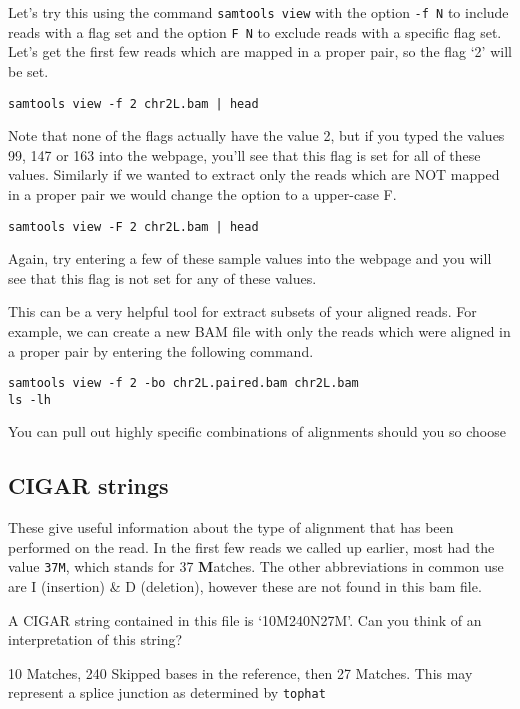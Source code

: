 \begin{steps}
Let's try this using the command \texttt{samtools view} with the option \texttt{-f N} to include reads with a flag set and the option \texttt{F N} to exclude reads with a specific flag set.
Let's get the first few reads which are mapped in a proper pair, so the flag `2' will be set.\\
\begin{lstlisting}
samtools view -f 2 chr2L.bam | head
\end{lstlisting}
Note that none of the flags actually have the value 2, but if you typed the values 99, 147 or 163 into the webpage, you'll see that this flag is set for all of these values.
Similarly if we wanted to extract only the reads which are NOT mapped in a proper pair we would change the option to a upper-case F.
\begin{lstlisting}
samtools view -F 2 chr2L.bam | head
\end{lstlisting}
Again, try entering a few of these sample values into the webpage and you will see that this flag is not set for any of these values.
\end{steps}

\begin{information}
This can be a very helpful tool for extract subsets of your aligned reads.
For example, we can create a new BAM file with only the reads which were aligned in a proper pair by entering the following command.
\begin{lstlisting}
samtools view -f 2 -bo chr2L.paired.bam chr2L.bam
ls -lh
\end{lstlisting}
You can pull out highly specific combinations of alignments should you so choose
\end{information}


\subsection{CIGAR strings}
\begin{note}
These give useful information about the type of alignment that has been performed on the read.
In the first few reads we called up earlier, most had the value \texttt{37M}, which stands for 37 \textbf{M}atches.
The other abbreviations in common use are I (insertion) \& D (deletion), however these are not found in this bam file.
\end{note}

\begin{questions}
A CIGAR string contained in this file is `10M240N27M'.
Can you think of an interpretation of this string? \\
\begin{answer}
10 Matches, 240 Skipped bases in the reference, then 27 Matches.
This may represent a splice junction as determined by \texttt{tophat}
\end{answer}
\end{questions}

